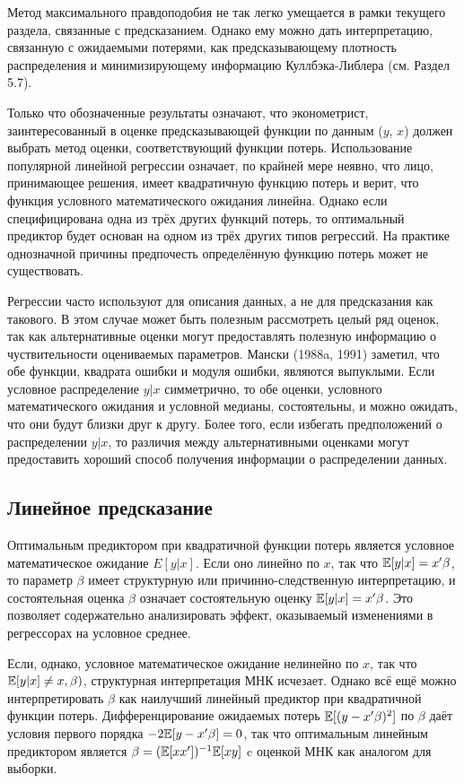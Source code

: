 Метод максимального правдоподобия не так легко умещается в рамки текущего раздела, связанные с предсказанием. Однако ему можно дать интерпретацию, связанную с ожидаемыми потерями, как предсказывающему плотность распределения и минимизирующему информацию Куллбэка-Либлера (см. Раздел 5.7).

Только что обозначенные результаты означают, что эконометрист, заинтересованный в оценке предсказывающей функции по данным ($y$, $x$) должен выбрать метод оценки, соответствующий функции потерь. Использование популярной линейной регрессии означает, по крайней мере неявно, что лицо, принимающее решения, имеет квадратичную функцию потерь и верит, что функция условного математического ожидания линейна. Однако если специфицирована одна из трёх других функций потерь, то оптимальный предиктор будет основан на одном из трёх других типов регрессий. На практике однозначной причины предпочесть определённую функцию потерь может не существовать.

Регрессии часто используют для описания данных, а не для предсказания как такового. В этом случае может быть полезным рассмотреть целый ряд оценок, так как альтернативные оценки могут предоставлять полезную информацию о чуствительности оцениваемых параметров. Мански (1988a, 1991) заметил, что обе функции, квадрата ошибки и модуля ошибки, являются выпуклыми. Если условное распределение $y|x$ симметрично, то обе оценки, условного математического ожидания и условной медианы, состоятельны, и можно ожидать, что они будут близки друг к другу. Более того, если избегать предположений о распределении $y|x$, то различия между альтернативными оценками могут предоставить хороший способ получения информации о распределении данных.

\subsection{Линейное предсказание}
Оптимальным предиктором при квадратичной функции потерь является условное математическое ожидание $E{[y|x]}$. Если оно линейно по $x$, так что $\mathbb{E}{[y|x]} = x' \beta $, то параметр $\beta$ имеет структурную или причинно-следственную интерпретацию, и состоятельная оценка $\beta$ означает состоятельную оценку $\mathbb{E}{[y|x]} = x' \beta $. Это позволяет 	содержательно анализировать эффект, оказываемый изменениями в регрессорах на условное среднее.

Если, однако, условное математическое ожидание нелинейно по $x$, так что $\mathbb{E}{[y|x]} \neq x, \beta)$, структурная интерпретация МНК исчезает. Однако всё ещё можно интерпретировать $\beta$ как наилучший линейный предиктор при квадратичной функции потерь. Дифференцирование ожидаемых потерь $\mathbb{E}{[(y - x' \beta)^2]}$ по $\beta$ даёт условия первого порядка $-2 \mathbb{E}{[y - x' \beta]} =0 $, так что оптимальным линейным предиктором является $\beta = (\mathbb{E}[xx'])^{-1}\mathbb{E}[xy]$ c оценкой МНК как аналогом для выборки.

